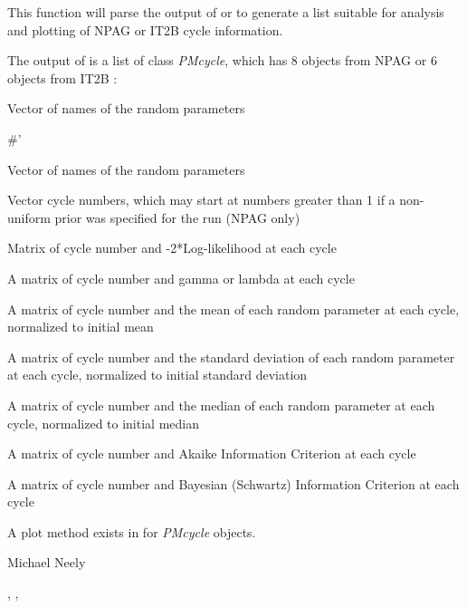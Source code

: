 \documentclass[a4paper]{book}
\begin{document}
%
\begin{Details}\relax
This function will parse the output of  or  to generate a
list suitable for analysis and plotting of NPAG or IT2B cycle information.
\end{Details}
%
\begin{Value}
The output of  is a list of class \emph{PMcycle},
which has 8 objects from NPAG or 6 objects from IT2B :
\begin{ldescription}
\item[\code{names }] Vector of names of the random parameters\end{ldescription}
\#' \begin{ldescription}
\item[\code{names }] Vector of names of the random parameters
\item[\code{cycnum }] Vector cycle numbers, which may start at numbers greater than 1 if a non-uniform prior was specified for the run (NPAG only)
\item[\code{ll }] Matrix of cycle number and -2*Log-likelihood at each cycle
\item[\code{gamlam }] A matrix of cycle number and gamma or lambda at each cycle
\item[\code{mean }] A matrix of cycle number and the mean of each random parameter at each cycle,  normalized to initial mean
\item[\code{sd }] A matrix of cycle number and the standard deviation of each random parameter
at each cycle,  normalized to initial standard deviation
\item[\code{median }] A matrix of cycle number and the median of each random parameter at each cycle,  normalized to initial median
\item[\code{aic }] A matrix of cycle number and Akaike Information Criterion at each cycle
\item[\code{bic }] A matrix of cycle number and Bayesian (Schwartz) Information Criterion at each cycle
\end{ldescription}
A plot method exists in  for \emph{PMcycle} objects.
\end{Value}
%
\begin{Author}\relax
Michael Neely
\end{Author}
%
\begin{SeeAlso}\relax
{}, ,  
\end{SeeAlso}
\end{document}
